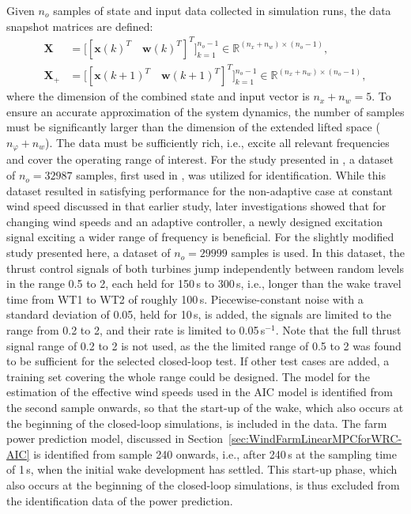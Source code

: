 Given $n_o$ samples of state and input data collected in simulation runs, the data snapshot matrices are defined:
\begin{align} \label{eq:DataCollAIC}
    \bm{X} &= \bigl[ [\bm{x}(k)^T \quad \bm{w}(k)^T]^T \bigr]_{k=1}^{n_o-1} \in \mathbb{R}^{(n_x+n_w)\times (n_o-1)}, \\
    \bm{X}_{+} &= \bigl[ [\bm{x}(k+1)^T\quad \bm{w}(k+1)^T]^T \bigr]_{k=1}^{n_o-1} \in \mathbb{R}^{(n_x+n_w)\times (n_o-1)},
\end{align}
where the dimension of the combined state and input vector is $n_x + n_w = 5$. To ensure an accurate approximation of the system dynamics, the number of samples must be significantly larger than the dimension of the extended lifted space ($n_\varphi + n_w$). The data must be sufficiently rich, i.e., excite all relevant frequencies and cover the operating range of interest. For the study presented in \cite{dittmer2022data}, a dataset of $n_o = 32987$ samples, first used in \cite{sharan2022Koopman}, was utilized for identification. While this dataset resulted in satisfying performance for the non-adaptive case at constant wind speed discussed in that earlier study, later investigations showed that for changing wind speeds and an adaptive controller, a newly designed excitation signal exciting a wider range of frequency is beneficial. For the slightly modified study presented here, a dataset of $n_o = 29999$ samples is used. In this dataset, the thrust control signals of both turbines jump independently between random levels in the range 0.5 to 2, each held for 150\,s to 300\,s, i.e., longer than the wake travel time from WT1 to WT2 of roughly 100\,s. Piecewise-constant noise with a standard deviation of 0.05, held for 10\,s, is added, the signals are limited to the range from 0.2 to 2, and their rate is limited to 0.05\,s$^{-1}$. Note that the full thrust signal range of 0.2 to 2 is not used, as the the limited range of 0.5 to 2 was found to be sufficient for the selected closed-loop test. If other test cases are added, a training set covering the whole range could be designed. The model for the estimation of the effective wind speeds used in the AIC model is identified from the second sample onwards, so that the start-up of the wake, which also occurs at the beginning of the closed-loop simulations, is included in the data. The farm power prediction model, discussed in Section~\ref{sec:WindFarmLinearMPCforWRC-AIC} is identified from sample 240 onwards, i.e., after 240\,s at the sampling time of 1\,s, when the initial wake development has settled. This start-up phase, which also occurs at the beginning of the closed-loop simulations, is thus excluded from the identification data of the power prediction.

